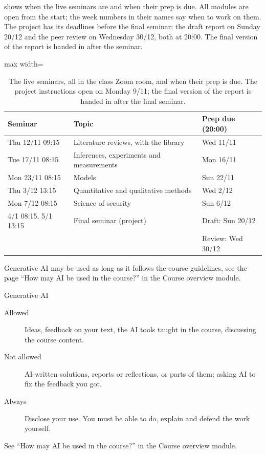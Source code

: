  shows when the live seminars are and when their prep is
due.
All modules are open from the start; the week numbers in their names say when
to work on them.
The project has its deadlines before the final seminar: the draft report on
Sunday 20/12 and the peer review on Wednesday 30/12, both at 20:00.
The final version of the report is handed in after the seminar.

\begin{frame}
  \begin{table}
    \footnotesize
    \begin{adjustbox}{max width=\linewidth}
    \begin{tabular}{lll}
      \toprule
      Seminar & Topic & Prep due (20:00) \\
      \midrule
      Thu 12/11 09:15 & Literature reviews, with the library & Wed 11/11 \\
      Tue 17/11 08:15 & Inferences, experiments and measurements & Mon 16/11 \\
      Mon 23/11 08:15 & Models & Sun 22/11 \\
      Thu 3/12 13:15 & Quantitative and qualitative methods & Wed 2/12 \\
      Mon 7/12 08:15 & Science of security & Sun 6/12 \\
      4/1 08:15, 5/1 13:15 & Final seminar (project) & Draft: Sun 20/12 \\
      & & Review: Wed 30/12 \\
      \bottomrule
    \end{tabular}
    \end{adjustbox}
    \caption{The live seminars, all in the class Zoom room, and when their
      prep is due. The project instructions open on Monday 9/11; the
      final version of the report is handed in after the final seminar.}
    \label{tab:schedule}
  \end{table}
\end{frame}

Generative AI may be used as long as it follows the course guidelines, see the
page \enquote{How may AI be used in the course?} in the Course overview module.

\begin{frame}
  \begin{block}{Generative AI}
    \small
    \begin{description}
      \item[Allowed] Ideas, feedback on your text, the AI tools taught in the
        course, discussing the course content.
      \item[Not allowed] AI-written solutions, reports or reflections, or parts
        of them; asking AI to fix the feedback you got.
      \item[Always] Disclose your use. You must be able to do, explain and
        defend the work yourself.
    \end{description}
  \end{block}
  See \enquote{How may AI be used in the course?} in the Course overview
  module.
\end{frame}

